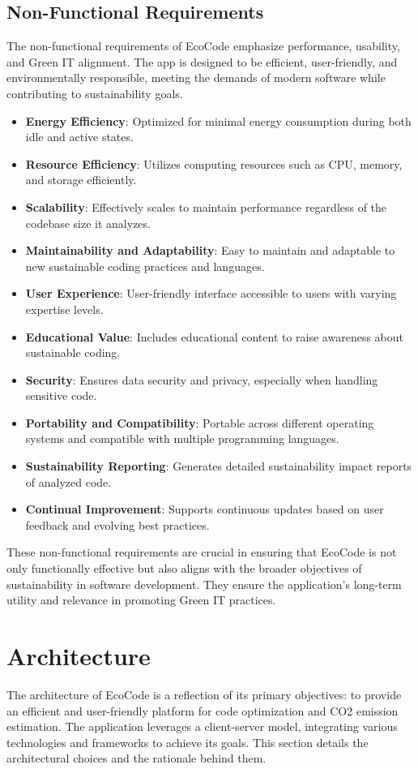 \documentclass[conference,compsoc]{IEEEtran}
\begin{document}
\subsection{Non-Functional Requirements}
The non-functional requirements of EcoCode emphasize performance, usability, and Green IT alignment. The app is designed to be efficient, user-friendly, and environmentally responsible, meeting the demands of modern software while contributing to sustainability goals.

\begin{itemize}
    \item \textbf{Energy Efficiency}: Optimized for minimal energy consumption during both idle and active states.
    \item \textbf{Resource Efficiency}: Utilizes computing resources such as CPU, memory, and storage efficiently.
    \item \textbf{Scalability}: Effectively scales to maintain performance regardless of the codebase size it analyzes.
    \item \textbf{Maintainability and Adaptability}: Easy to maintain and adaptable to new sustainable coding practices and languages.
    \item \textbf{User Experience}: User-friendly interface accessible to users with varying expertise levels.
    \item \textbf{Educational Value}: Includes educational content to raise awareness about sustainable coding.
    \item \textbf{Security}: Ensures data security and privacy, especially when handling sensitive code.
    \item \textbf{Portability and Compatibility}: Portable across different operating systems and compatible with multiple programming languages.
    \item \textbf{Sustainability Reporting}: Generates detailed sustainability impact reports of analyzed code.
    \item \textbf{Continual Improvement}: Supports continuous updates based on user feedback and evolving best practices.
\end{itemize}

These non-functional requirements are crucial in ensuring that EcoCode is not only functionally effective but also aligns with the broader objectives of sustainability in software development. They ensure the application's long-term utility and relevance in promoting Green IT practices.

\section{Architecture}
The architecture of EcoCode is a reflection of its primary objectives: to provide an efficient and user-friendly platform for  code optimization and CO2 emission estimation. The application leverages a client-server model, integrating various technologies and frameworks to achieve its goals. This section details the architectural choices and the rationale behind them.
\end{document}
